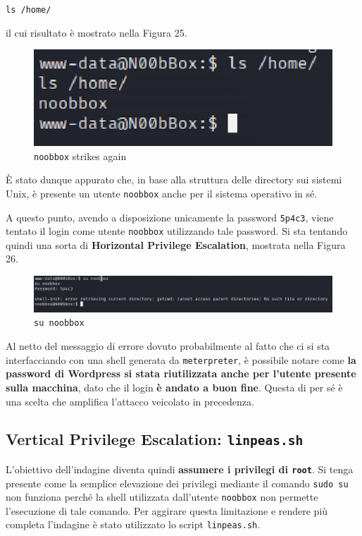 \documentclass[a4paper, 12pt, oneside]{article}
\begin{document}
\begin{center}
    \texttt{ls /home/}
\end{center}

il cui risultato è mostrato nella Figura 25.

\begin{figure}[h!]
    \centering
    \includegraphics[width=\textwidth]{img/ls-home.png}
    \caption{\texttt{noobbox} strikes again}
\end{figure}

È stato dunque appurato che, in base alla struttura delle directory sui sistemi Unix, è presente un utente \texttt{noobbox} anche per il sistema operativo in sé.

A questo punto, avendo a disposizione unicamente la password \texttt{5p4c3}, viene tentato il login come utente \texttt{noobbox} utilizzando tale password. Si sta tentando quindi una sorta di \textbf{Horizontal Privilege Escalation}, mostrata nella Figura 26.

\begin{figure}[h!]
    \centering
    \includegraphics[width=\textwidth]{img/su-noobbox.png}
    \caption{\texttt{su noobbox}}
\end{figure}

\newpage
Al netto del messaggio di errore dovuto probabilmente al fatto che ci si sta interfacciando con una shell generata da \texttt{meterpreter}, è possibile notare come \textbf{la password di Wordpress si stata riutilizzata anche per l'utente presente sulla macchina}, dato che il login \textbf{è andato a buon fine}. Questa di per sé è una scelta che amplifica l'attacco veicolato in precedenza.

\subsection{Vertical Privilege Escalation: \texttt{linpeas.sh}}
L'obiettivo dell'indagine diventa quindi \textbf{assumere i privilegi di \texttt{root}}. Si tenga presente come la semplice elevazione dei privilegi mediante il comando \texttt{sudo su} non funziona perché la shell utilizzata dall'utente \texttt{noobbox} non permette l'esecuzione di tale comando. Per aggirare questa limitazione e rendere più completa l'indagine è stato utilizzato lo script \texttt{linpeas.sh}.
\end{document}
